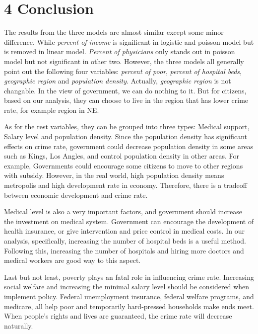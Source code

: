 \documentclass[oneside,11pt]{homework}
\begin{document}
\section*{4 Conclusion}

The results from the three models are almost similar except some minor difference. While \textit{percent of income} is significant in logistic and poisson model but is removed in linear model. \textit{Percent of physicians} only stands out in poisson model but not significant in other two. However, the three models all generally point out the following four variables: \textit{percent of poor}, \textit{percent of hospital beds}, \textit{geographic region} and \textit{population density}. Actually, \textit{geographic region} is not changable. In the view of government, we can do nothing to it. But for citizens, based on our analysis, they can choose to live in the region that has lower crime rate, for example region in NE.\par

As for the rest variables, they can be grouped into three types: Medical support, Salary level and population density. Since the population density has significant effects on crime rate, government could decrease population density in some areas such as Kings, Los Angles, and control population density in other areas. For example, Governments could encourage some citizens to move to other regions with subsidy. However, in the real world, high population density means metropolis and high development rate in economy. Therefore, there is a tradeoff between economic development and crime rate.\par

Medical level is also a very important factors, and government should increase the investment on medical system. Government can encourage the development of health insurance, or give intervention and price control in medical costs. In our analysis, specifically, increasing the number of hospital beds is a useful method. Following this, increasing the number of hospitals and hiring more doctors and medical workers are good way to this aspect.\par

Last but not least, poverty plays an fatal role in influencing crime rate. Increasing social welfare and increasing the minimal salary level should be considered when implement policy.  Federal unemployment insurance, federal welfare programs, and medicare, all help poor and temporarily hard-pressed households make ends meet. When people's rights and lives are guaranteed, the crime rate will decrease naturally.\par
\end{document}

